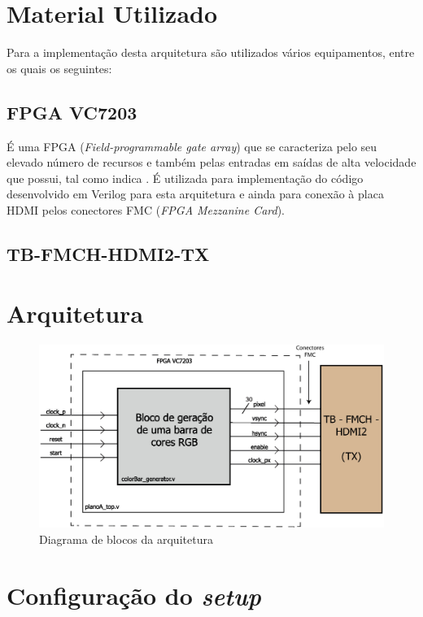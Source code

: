 \documentclass[11pt,a4paper]{article}
\begin{document}
	\section{Material Utilizado}
	Para a implementação desta arquitetura são utilizados vários equipamentos, entre os quais os seguintes:
	\subsection{FPGA VC7203}
	É uma FPGA (\textit{Field-programmable gate array}) que se caracteriza pelo seu elevado número de recursos e também pelas entradas em saídas de alta velocidade que possui, tal como indica \cite{R008}. É utilizada para implementação do código desenvolvido em Verilog para esta arquitetura e ainda para conexão à placa HDMI pelos conectores FMC (\textit{FPGA Mezzanine Card}).
	\subsection{TB-FMCH-HDMI2-TX}
	
	
	\section{Arquitetura}
	
	
	\begin{figure}[h]
		\begin{center}
			\includegraphics[width=1.0\textwidth]{planA} 
			\caption{Diagrama de blocos da arquitetura}
			\label{fig:planoA}
		\end{center}
	\end{figure}

	\section{Configuração do \textit{setup}}
	
\end{document}
